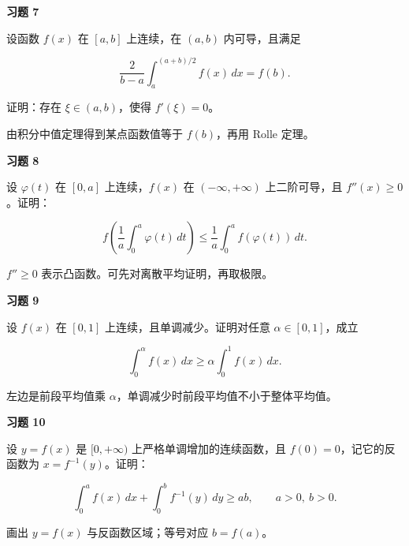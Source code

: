 \begin{exercisebox}
\textbf{习题 7 }

设函数 \(f(x)\) 在 \([a,b]\) 上连续，在 \((a,b)\) 内可导，且满足

\[
        \frac{2}{b-a}\int_a^{(a+b)/2} f(x)\,dx=f(b).
      \]

证明：存在 \(\xi\in(a,b)\)，使得 \(f'(\xi)=0\)。

\begin{hintbox}
由积分中值定理得到某点函数值等于 \(f(b)\)，再用 Rolle 定理。
\end{hintbox}
\end{exercisebox}

\begin{exercisebox}
\textbf{习题 8 }

设 \(\varphi(t)\) 在 \([0,a]\) 上连续，\(f(x)\) 在 \((-\infty,+\infty)\) 上二阶可导，且 \(f''(x)\ge0\)。证明：

\[
        f\left(\frac1a\int_0^a \varphi(t)\,dt\right)
        \le
        \frac1a\int_0^a f(\varphi(t))\,dt.
      \]

\begin{hintbox}
\(f''\ge0\) 表示凸函数。可先对离散平均证明，再取极限。
\end{hintbox}
\end{exercisebox}

\begin{exercisebox}
\textbf{习题 9 }

设 \(f(x)\) 在 \([0,1]\) 上连续，且单调减少。证明对任意 \(\alpha\in[0,1]\)，成立

\[
        \int_0^\alpha f(x)\,dx\ge
        \alpha\int_0^1 f(x)\,dx.
      \]

\begin{hintbox}
左边是前段平均值乘 \(\alpha\)，单调减少时前段平均值不小于整体平均值。
\end{hintbox}
\end{exercisebox}

\begin{exercisebox}
\textbf{习题 10 }

设 \(y=f(x)\) 是 \([0,+\infty)\) 上严格单调增加的连续函数，且 \(f(0)=0\)，记它的反函数为 \(x=f^{-1}(y)\)。证明：

\[
        \int_0^a f(x)\,dx+\int_0^b f^{-1}(y)\,dy\ge ab,
        \qquad a>0,\ b>0.
      \]

\begin{hintbox}
画出 \(y=f(x)\) 与反函数区域；等号对应 \(b=f(a)\)。
\end{hintbox}
\end{exercisebox}

